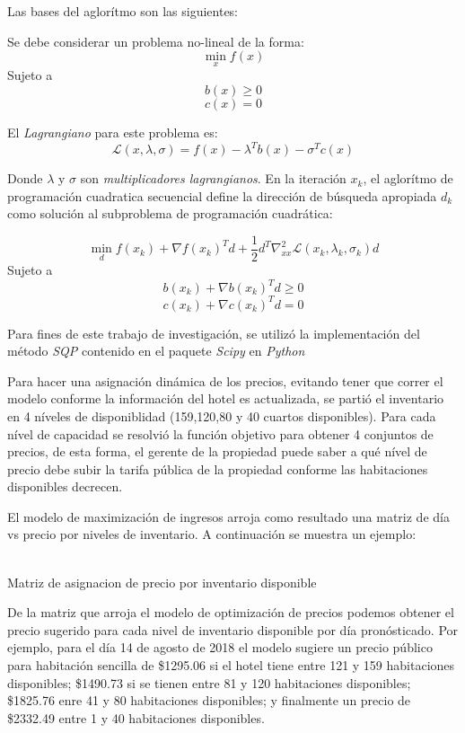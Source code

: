 Las bases del aglorítmo son las siguientes:

Se debe considerar un problema no-lineal de la forma: $$\min_x f(x)$$ Sujeto a $$b(x) \geq 0$$ $$c(x) = 0$$

El \emph{Lagrangiano} para este problema es: $$\mathcal{L}(x,\lambda,\sigma)=f(x)-\lambda^Tb(x)-\sigma^Tc(x)$$

Donde $\lambda$ y $\sigma$ son \emph{multiplicadores lagrangianos}. En la iteración $x_k$, el aglorítmo de programación cuadratica secuencial define la dirección de búsqueda apropiada $d_k$ como solución al subproblema de programación cuadrática: 

$$\min_d f(x_k) + \nabla f(x_k)^T d + \frac{1}{2}d^T \nabla_{xx}^2 \mathcal{L} (x_k,\lambda_k,\sigma_k)d$$
Sujeto a
$$b(x_k) + \nabla b(x_k)^T d\geq 0$$
$$c(x_k) + \nabla c(x_k)^T d = 0$$

Para fines de este trabajo de investigación, se utilizó la implementación del método \emph{SQP} contenido en el paquete \emph{Scipy} en  \emph{Python}

Para hacer una asignación dinámica de los precios, evitando tener que correr el modelo conforme la información del hotel es actualizada, se partió el inventario en 4 níveles de disponiblidad (159,120,80 y 40 cuartos disponibles). Para cada nível de capacidad se resolvió la función objetivo para obtener 4 conjuntos de precios, de esta forma, el gerente de la propiedad puede saber a qué nível de precio debe subir la tarifa pública de la propiedad conforme las habitaciones disponibles decrecen.

El modelo de maximización de ingresos arroja como resultado una matriz de día vs precio por niveles de inventario. A continuación se muestra un ejemplo:
\\
\\

\begin{table}[H]
  \centering
  \par
  \caption{Matriz de asignacion de precio por inventario disponible} 
\end{table}

De la matriz que arroja el modelo de optimización de precios podemos obtener el precio sugerido para cada nivel de inventario disponible por día pronósticado. Por ejemplo, para el día 14 de agosto de 2018 el modelo sugiere un precio público para habitación sencilla de \$1295.06 si el hotel tiene entre 121 y 159 habitaciones disponibles; \$1490.73 si se tienen entre 81 y 120 habitaciones disponibles; \$1825.76 enre 41 y 80 habitaciones disponibles; y finalmente un precio de \$2332.49 entre 1 y 40 habitaciones disponibles.

